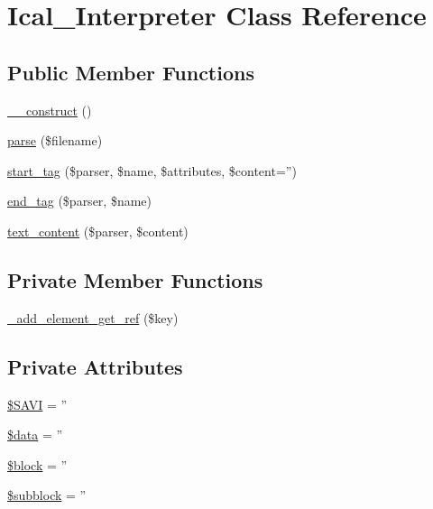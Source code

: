 \hypertarget{classIcal__Interpreter}{
\section{Ical\_\-Interpreter Class Reference}
\label{classIcal__Interpreter}
}
\subsection*{Public Member Functions}
\begin{DoxyCompactItemize}
\item 
\hyperlink{classIcal__Interpreter_a095c5d389db211932136b53f25f39685}{\_\-\_\-construct} ()
\item 
\hyperlink{classIcal__Interpreter_aec9a6d35c77c3e6b8b688d1c03fde5ee}{parse} (\$filename)
\item 
\hyperlink{classIcal__Interpreter_a398b34d360886dc8a5309792400e4781}{start\_\-tag} (\$parser, \$name, \$attributes, \$content='')
\item 
\hyperlink{classIcal__Interpreter_a219ac46a3dfb140ba53144e4116e4134}{end\_\-tag} (\$parser, \$name)
\item 
\hyperlink{classIcal__Interpreter_a32fc01da180b795fb309168e9f4bd3c5}{text\_\-content} (\$parser, \$content)
\end{DoxyCompactItemize}
\subsection*{Private Member Functions}
\begin{DoxyCompactItemize}
\item 
\hyperlink{classIcal__Interpreter_a31f9ef9369186dce8b0978f587d37998}{\_\-add\_\-element\_\-get\_\-ref} (\$key)
\end{DoxyCompactItemize}
\subsection*{Private Attributes}
\begin{DoxyCompactItemize}
\item 
\hyperlink{classIcal__Interpreter_a6b1385559f5a7063aaf24688452c5d55}{\$SAVI} = ''
\item 
\hyperlink{classIcal__Interpreter_a6efc15b5a2314dd4b5aaa556a375c6d6}{\$data} = ''
\item 
\hyperlink{classIcal__Interpreter_a7f8f86b37cd48a37bf0df573d8512d11}{\$block} = ''
\item 
\hyperlink{classIcal__Interpreter_a2d499c39518df37e2759becba8383526}{\$subblock} = ''
\end{DoxyCompactItemize}


